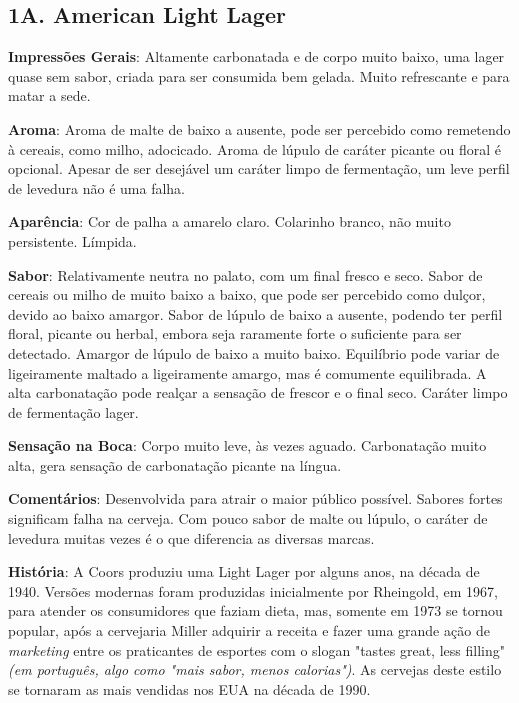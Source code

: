 \subsection*{1A. American Light Lager}
\textbf{Impressões Gerais}: Altamente carbonatada e de corpo muito baixo, uma lager quase sem sabor, criada para ser consumida bem gelada. Muito refrescante e para matar a sede.

\textbf{Aroma}: Aroma de malte de baixo a ausente, pode ser percebido como remetendo à cereais, como milho, adocicado. Aroma de lúpulo de caráter picante ou floral é opcional. Apesar de ser desejável um caráter limpo de fermentação, um leve perfil de levedura não é uma falha.

\textbf{Aparência}: Cor de palha a amarelo claro. Colarinho branco, não muito persistente. Límpida.

\textbf{Sabor}: Relativamente neutra no palato, com um final fresco e seco. Sabor de cereais ou milho de muito baixo a baixo, que pode ser percebido como dulçor, devido ao baixo amargor. Sabor de lúpulo de baixo a ausente, podendo ter perfil floral, picante ou herbal, embora seja raramente forte o suficiente para ser detectado. Amargor de lúpulo de baixo a muito baixo. Equilíbrio pode variar de ligeiramente maltado a ligeiramente amargo, mas é comumente equilibrada. A alta carbonatação pode realçar a sensação de frescor e o final seco. Caráter limpo de fermentação lager.

\textbf{Sensação na Boca}: Corpo muito leve, às vezes aguado. Carbonatação muito alta, gera sensação de carbonatação picante na língua.

\textbf{Comentários}: Desenvolvida para atrair o maior público possível. Sabores fortes significam falha na cerveja. Com pouco sabor de malte ou lúpulo, o caráter de levedura muitas vezes é o que diferencia as diversas marcas.

\textbf{História}: A Coors produziu uma Light Lager por alguns anos, na década de 1940. Versões modernas foram produzidas inicialmente por Rheingold, em 1967, para atender os consumidores que faziam dieta, mas, somente em 1973 se tornou popular, após a cervejaria Miller adquirir a receita e fazer uma grande ação de \textit{marketing} entre os praticantes de esportes com o slogan "tastes great, less filling" \textit{(em português, algo como "mais sabor, menos calorias")}. As cervejas deste estilo se tornaram as mais vendidas nos EUA na década de 1990.

